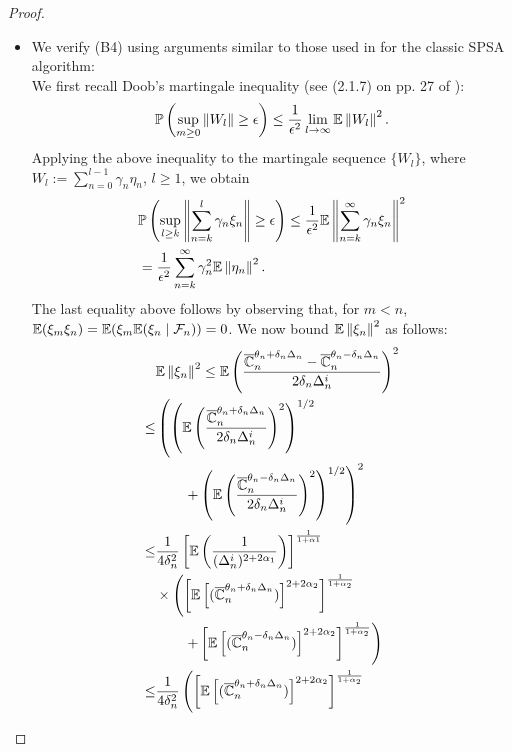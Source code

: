 \begin{proof}
\begin{itemize}
\item We verify (B4) using arguments similar to those used in \cite{spall} for the classic SPSA algorithm:\\
We first recall Doob's martingale inequality (see (2.1.7) on pp. 27 of \cite{kushner-clark}):
\begin{align}
\mathbb{P}\left(  \sup_{m\geq 0}   \left\|W_l\right\| \geq \epsilon  \right) \le \dfrac{1}{\epsilon^2} \lim_{l\rightarrow \infty} \mathbb{E} \left\|W_l\right\|^2. 
\end{align}
Applying the above inequality to the martingale sequence $\{W_l\}$, where  $W_l := \sum_{n=0}^{l-1} \gamma_n \eta_n$, $l\ge 1$, we obtain
\begin{align}
&\mathbb{P}\left(  \sup_{l\geq k}   \left\|\sum_{n=k}^{l} \gamma_n \xi_n\right\| \geq \epsilon  \right) \le \dfrac{1}{\epsilon^2} \mathbb{E} \left\|
\sum_{n=k}^{\infty} \gamma_n \xi_n\right\|^2 \\
&= \dfrac{1}{\epsilon^2} \sum_{n=k}^{\infty} \gamma_n^2 \mathbb{E}\left\| \eta_n\right\|^2. \label{eq:b4}
\end{align}
The last equality above follows by observing that, for $m < n$, $\mathbb{E}(\xi_m \xi_n) = \mathbb{E}(\xi_m \mathbb{E}(\xi_n\mid \mathcal{F}_n))=0$.
We now bound $\mathbb{E}\left\| \xi_n\right\|^2$ as follows:
\begin{align}
&\E\left\| \xi_n\right\|^2\le \E\left(\dfrac{\overline \C_n^{\theta_n + \delta_n \Delta_n} -\overline \C_n^{\theta_n - \delta_n \Delta_n}}{2 \delta_n \Delta_n^i}\right)^2 \label{eq:mi}\\
\le &\left(\left(\E\left(\dfrac{\overline \C_n^{\theta_n + \delta_n \Delta_n}}{2 \delta_n \Delta_n^i}\right)^2\right)^{1/2}\right.\nonumber\\ 
&\qquad\left.+ \left(\E\left(\dfrac{\overline \C_n^{\theta_n - \delta_n \Delta_n}}{2 \delta_n \Delta_n^i}\right)^2\right)^{1/2}\right)^2 \label{eq:minko}\\
\le &\frac1{4\delta_n^2} \left[ \E\left(\frac1{(\Delta_n^i)^{2+2\alpha_1}}\right) \right]^{\frac{1}{1+\alpha1}} \nonumber\\
& \times \left(\left[\E\left[ (\overline \C_n^{\theta_n + \delta_n \Delta_n})\right]^{2+2\alpha_2}\right]^{\frac{1}{1+\alpha_2}} \right.\nonumber\\
&\left.\qquad+
\left[\E\left[ (\overline \C_n^{\theta_n - \delta_n \Delta_n})\right]^{2+2\alpha_2}\right]^{\frac{1}{1+\alpha_2}}\right)\label{eq:holder}\\
\le &\frac1{4\delta_n^2} \left(\left[\E\left[ (\overline \C_n^{\theta_n + \delta_n \Delta_n})\right]^{2+2\alpha_2}\right]^{\frac{1}{1+\alpha_2}} \right.\nonumber\\

\end{align}
\end{itemize}
\end{proof}
